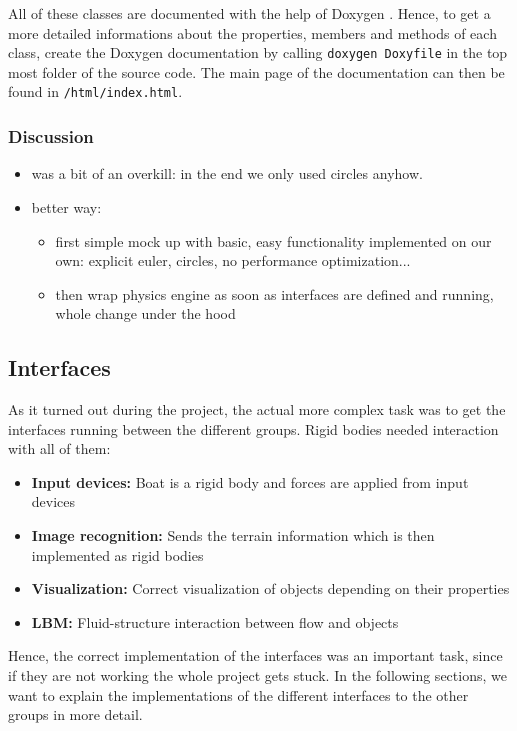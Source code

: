 All of these classes are documented with the help of Doxygen \cite{Doxygen}. Hence, to get a more detailed informations about the properties, members and methods of each class, create the Doxygen documentation by calling \texttt{doxygen Doxyfile} in the top most folder of the source code. The main page of the documentation can then be found in \texttt{/html/index.html}.

\subsubsection{Discussion}
\begin{itemize}
\item was a bit of an overkill: in the end we only used circles anyhow.
\item better way: 
\begin{itemize}
\item first simple mock up with basic, easy functionality implemented on our own: explicit euler, circles, no performance optimization...
\item then wrap physics engine as soon as interfaces are defined and running, whole change under the hood
\end{itemize}
\end{itemize}

\subsection{Interfaces}
As it turned out during the project, the actual more complex task was to get the interfaces running between the different groups. Rigid bodies needed interaction with all of them:
\begin{itemize}
\item \textbf{Input devices:} Boat is a rigid body and forces are applied from input devices
\item \textbf{Image recognition:} Sends the terrain information which is then implemented as rigid bodies
\item \textbf{Visualization:} Correct visualization of objects depending on their properties
\item \textbf{LBM:} Fluid-structure interaction between flow and objects
\end{itemize}
Hence, the correct implementation of the interfaces was an important task, since if they are not working the whole project gets stuck. In the following sections, we want to explain the implementations of the different interfaces to the other groups in more detail.
